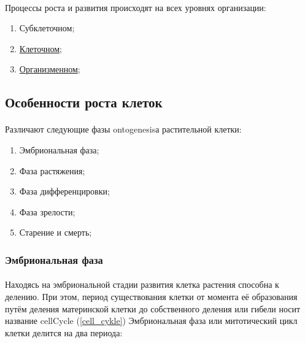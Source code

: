 \paragraph*{}Процессы роста и развития происходят на всех уровнях организации:

\begin{enumerate}
	\item Субклеточном;
	\item \hyperlink{cell_ontogenesis}{Клеточном};
	\item \hyperlink{plant_ontogenesis}{Организменном};
\end{enumerate}

\subsection*{Особенности роста клеток}

\paragraph*{}Различают следующие фазы \hypertarget{cell_ontogenesis}{\gls{ontogenesis}а} растительной клетки:

\begin{enumerate}
	\item Эмбриональная фаза;
	\item Фаза растяжения;
	\item Фаза дифференцировки;
	\item Фаза зрелости;
	\item Старение и смерть;
\end{enumerate}


\subsubsection*{Эмбриональная фаза}

\paragraph*{}Находясь на эмбриональной стадии развития клетка растения способна к делению. При этом, период существования клетки от момента её образования путём деления материнской клетки до собственного деления или гибели носит название \gls{cellCycle} (\ris \ref{cell_cykle}) Эмбриональная фаза или митотический цикл клетки делится на два периода: 


